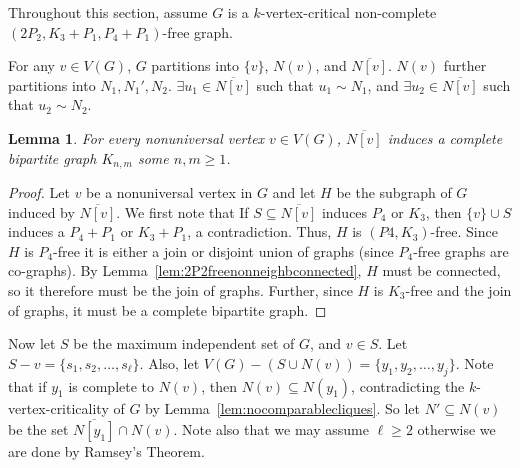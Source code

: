 \documentclass[11pt]{article}
\newtheorem{lemma}[theorem]{Lemma}
\theoremstyle{definition}
\newcommand{\forbid}{$(2P_2, K_3+P_1,P_4+P_1)$}
\newcommand{\noneighbs}{\overline{N[v]}}
\begin{document}
Throughout this section, assume $G$ is a $k$-vertex-critical non-complete \forbid -free graph.

For any $v\in V(G)$, $G$ partitions into $\{v\}$, $N(v)$, and $\overline{N[v]}$. $N(v)$ further partitions into $N_1, N_1', N_2$. $\exists u_1 \in \noneighbs$ such that $u_1 \sim N_1$, and $\exists u_2 \in \noneighbs$ such that $u_2 \sim N_2$.

\begin{lemma}\label{lem:completebipartite}
For every nonuniversal vertex $v\in V(G)$,  $\noneighbs$ induces a complete bipartite graph $K_{n,m}$ some $n,m\ge 1$.
\end{lemma}
\begin{proof}
Let $v$ be a nonuniversal vertex in $G$ and let $H$ be the subgraph of $G$ induced by $\noneighbs$. We first note that If $S\subseteq\noneighbs$ induces $P_4$ or $K_3$, then $\{v\}\cup S$ induces a $P_4+P_1$ or $K_3+P_1$, a contradiction. Thus, $H$ is $(P4, K_3)$-free. Since $H$ is $P_4$-free it is either a join or disjoint union of graphs (since $P_4$-free graphs are co-graphs). By Lemma~\ref{lem:2P2freenonneighbconnected}, $H$ must be connected, so it therefore must be the join of graphs. Further, since $H$ is $K_3$-free and the join of graphs, it must be a complete bipartite graph. 
\end{proof}


Now let $S$ be the maximum independent set of $G$, and $v \in S$. Let $S - v = \{s_1, s_2, \dots, s_{\ell}\}$. Also, let $V(G) - (S \cup N(v)) = \{y_1, y_2, \dots, y_j\}$. Note that if $y_1$ is complete to $N(v)$, then $N(v)\subseteq N(y_1)$, contradicting the $k$-vertex-criticality of $G$ by Lemma~\ref{lem:nocomparablecliques}. So let $N' \subseteq N(v)$ be the set $\overline{N[y_1]}\cap N(v)$. Note also that we may assume $\ell\ge 2$ otherwise we are done by Ramsey's Theorem. 
\end{document}
